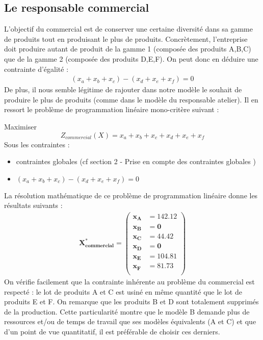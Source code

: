 \documentclass[12pt]{article}
\begin{document}
\subsection{Le responsable commercial}
L'objectif du commercial est de conserver une certaine diversité dans sa gamme de produits tout en produisant le plus de produits. Concrètement, l'entreprise doit produire autant de produit de la gamme 1 (composée des produits A,B,C) que de la gamme 2 (composée des produits D,E,F).
On peut donc en déduire une contrainte d'égalité :
\begin{align*} 
(x_{a} + x_{b} + x_{c}) - (x_{d} + x_{e} + x_{f}) = 0
\end{align*}
De plus, il nous semble légitime de rajouter dans notre modèle le souhait de produire le plus de produits (comme dans le modèle du responsable atelier).
Il en ressort le problème de programmation linéaire mono-critère suivant :
\begin{tcolorbox}
Maximiser
\begin{equation*}
 Z_{commercial}(X)=x_{a} + x_{b} + x_{c} + x_{d} + x_{e} + x_{f}
\end{equation*}
Sous les contraintes :
\begin{itemize}
\item contraintes globales (cf section 2 - Prise en compte des contraintes globales )
\item $(x_{a} + x_{b} + x_{c}) - (x_{d} + x_{e} + x_{f}) = 0$
\end{itemize}
\end{tcolorbox}
La résolution mathématique de ce problème de programmation linéaire donne les résultats suivants :
\begin{align*}
\boldsymbol{X^{*}_{commercial} = 
   \left (
   \begin{aligned}
      x_{A} &= 142.12 \\
      x_{B} &= 0 \\
      x_{C} &= 44.42 \\
      x_{D} &= 0 \\
      x_{E} &= 104.81 \\
      x_{F} &= 81.73 \\
   \end{aligned}
   \right )
 } 
\end{align*}
On vérifie facilement que la contrainte inhérente au problème du commercial est respecté : le lot de produits A et C est usiné en même quantité que le lot de produits E et F.
On remarque que les produits B et D sont totalement supprimés de la production. Cette particularité montre que le modèle B demande plus de ressources et/ou de temps de travail que ses modèles équivalents (A et C) et que d'un point de vue quantitatif, il est préférable de choisir ces derniers. 
\end{document}
